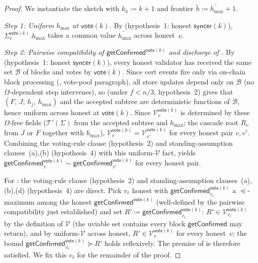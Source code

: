 \ifx\litemode\undefined\documentclass{article}\fi
\newcommand{\V}[0]{\ensuremath{\mathcal{V}}}
\newcommand{\hmax}{\ensuremath{h_{\max}}\xspace}
\newcommand{\viableTree}{\ensuremath{\mathcal{T}'}}
\newcommand{\vote}{\ensuremath{\mathsf{vote}}}
\newcommand{\comm}[1]{\ensuremath{\widetilde{#1}}}
\newcommand{\syncer}{\textsf{syncer}\xspace}
\newcommand{\getConfirmed}{\textsf{getConfirmed}\xspace}
\theoremstyle{plain}
\theoremstyle{definition}
\theoremstyle{remark}
\begin{document}
\begin{proof}
We instantiate the sketch with $k_h \coloneqq k+1$ and frontier $\comm{h} \coloneqq \comm{\hmax}+1$.

\emph{Step 1: Uniform $\hmax$ at $\vote(k)$.}
By  (hypothesis~1: honest $\syncer(k)$), $\Sigma_v^{\vote(k)}.\hmax$ takes a common value $\comm{\hmax}$ across honest~$v$.

\emph{Step 2: Pairwise compatibility of $\getConfirmed^{\vote(k)}$ and discharge of .}
By  (hypothesis~1: honest $\syncer(k)$), every honest validator has received the same set $\mathcal{B}$ of blocks and votes by $\vote(k)$. Since cert events fire only via on-chain block processing (, vote-pool paragraph), all store updates depend only on $\mathcal{B}$ (no $\Omega$-dependent step intervenes), so  (under $f<n/3$, hypothesis~2) gives that $(F,\, J,\, h_j,\, \hmax)$ and the accepted subtree are deterministic functions of $\mathcal{B}$, hence uniform across honest at $\vote(k)$. Since $\V_v^{\vote(k)}$ is determined by these $\Omega$-free fields ($\viableTree(\Sigma)$ from the accepted subtree and $\hmax$; the cascade root $R_v$ from $J$ or $F$ together with $\hmax$), $\V_v^{\vote(k)} = \V_{v'}^{\vote(k)}$ for every honest pair $v, v'$. Combining the voting-rule clause (hypothesis~2) and standing-assumption clauses~(a),(b) (hypothesis~4) with this uniform-$\V$ fact,  yields $\getConfirmed_v^{\vote(k)} \sim \getConfirmed_{v'}^{\vote(k)}$ for every honest pair.

For : the voting-rule clause (hypothesis~2) and standing-assumption clauses~(a),(b),(d) (hypothesis~4) are direct. Pick $v_\ell$ honest with $\getConfirmed_{v_\ell}^{\vote(k)}$ a $\preceq$-maximum among the honest $\getConfirmed^{\vote(k)}$ (well-defined by the pairwise compatibility just established) and set $R' \coloneqq \getConfirmed_{v_\ell}^{\vote(k)}$: $R' \in \V_{v_\ell}^{\vote(k)}$ by the definition of $\V$ (the uviable set contains every block $\getConfirmed$ may return), and by uniform-$\V$ across honest, $R' \in \V_v^{\vote(k)}$ for every honest~$v$; the bound $\getConfirmed_{v_\ell}^{\vote(k)} \succeq R'$ holds reflexively. The premise of  is therefore satisfied. We fix this $v_\ell$ for the remainder of the proof.


\end{proof}
\end{document}
